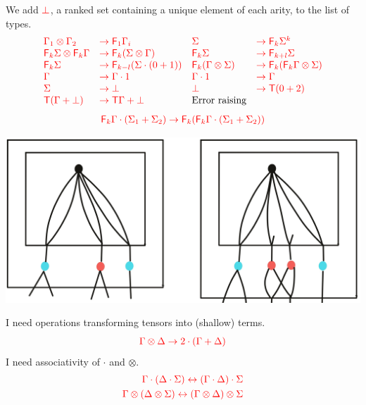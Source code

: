 We add ${\color{red}{\bot}}$, a ranked set containing a unique element of each arity, to the list of types. 
$$
\begin{array}{llll}
{\color{red}{\Gamma_1\otimes\Gamma_2}} &{\color{red}{\to {\color{red}{\mathsf F_{1}}}\Gamma_i}}&
{\color{red}{\Sigma}}&{\color{red}{\to {\color{red}{\mathsf F_{k}}}\Sigma^k}}\\
{\color{red}{{\color{red}{\mathsf F_{k}}}\Sigma \otimes {\color{red}{\mathsf F_{k}}}\Gamma }}&{\color{red}{\to {\color{red}{\mathsf F_{k}}}(\Sigma\otimes \Gamma)}}&
{\color{red}{{\color{red}{\mathsf F_{k}}}\Sigma }}&{\color{red}{\to {\color{red}{\mathsf F_{k+l}}}\Sigma }}\\
{\color{red}{{\color{red}{\mathsf F_{k}}}\Sigma }}&{\color{red}{\to {\color{red}{\mathsf F_{k-l}}}(\Sigma\cdot(0+1))}}&
{\color{red}{{\color{red}{\mathsf F_{k}}}(\Gamma\otimes \Sigma) }}&{\color{red}{\to {\color{red}{\mathsf F_{k}}}({\color{red}{\mathsf F_{k}}}\Gamma \otimes \Sigma)}}\\
{\color{red}{\Gamma }}&{\color{red}{\to \Gamma\cdot 1}}& {\color{red}{\Gamma\cdot 1 }}&{\color{red}{\to \Gamma}}\\
{\color{red}{\Sigma}}&{\color{red}{\to\bot}}&
{\color{red}{\bot }}&{\color{red}{\to {\color{red}{\mathsf T}}(0+2)}}\\
{\color{red}{{\color{red}{\mathsf T}}(\Gamma+\bot)}}&{\color{red}{\to {\color{red}{\mathsf T}}\Gamma+\bot}} & \text{Error raising}
\end{array}$$
\begin{align*}
{\color{red}{{\color{red}{\mathsf F_{k}}}\Gamma\cdot(\Sigma_1+\Sigma_2)\to {\color{red}{\mathsf F_{k}}}({\color{red}{\mathsf F_{k}}}\Gamma\cdot(\Sigma_1+\Sigma_2))}}
\end{align*}
\begin{center}
\includegraphics[scale=.05]{MyPicBasicFun1.jpg}
\end{center}
I need operations transforming tensors into (shallow) terms.
\begin{align*}
{\color{red}{\Gamma\otimes \Delta \to 2\cdot(\Gamma+\Delta)}}
\end{align*}
I need associativity of $\cdot$ and $\otimes$.
\begin{align*}
{\color{red}{\Gamma\cdot(\Delta\cdot\Sigma) \leftrightarrow (\Gamma\cdot\Delta)\cdot\Sigma}}\\
{\color{red}{\Gamma\otimes(\Delta\otimes\Sigma) \leftrightarrow (\Gamma\otimes\Delta)\otimes\Sigma}}
\end{align*}

